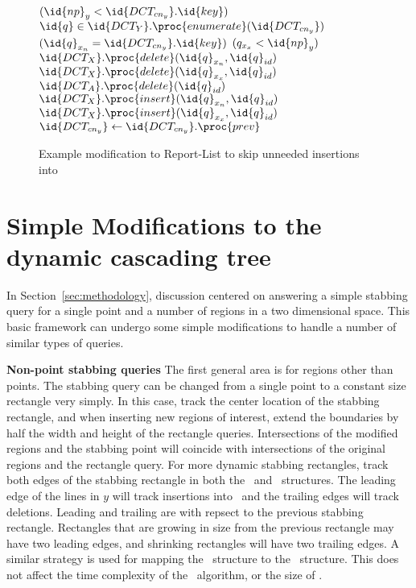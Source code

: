 \documentclass{sig-alternate}
\newcommand{\ct}{\id{DCT}}
\newcommand{\meth}{.}
\newcommand{\inC}[1]{{\id{DCT_{#1}}}}
\newcommand{\X}{{\inC{X}}}
\newcommand{\Y}{{\inC{Y}}}
\newcommand{\A}{{\inC{A}}}
\newcommand{\cny}{{\inC{cn_y}}}
\begin{document}
\begin{figure}[htbp]
  \centering
\begin{codebox}
\zi \While $(\id{np}_y < \cny \meth \id{key})$
\zi   \Do
      $\id{q} \in \Y \meth \proc{enumerate}(\cny)$
\zi       \Do
         \If $(\id{q}_{x_n} = \cny \meth \id{key})$
\zi            \Then
\zi               \If $(q_{x_x} < \id{np}_y)$
\zi                 \Then
\zi                   $\X \meth \proc{delete}(\id{q}_{x_n},\id{q}_{id})$
\zi                   $\X \meth \proc{delete}(\id{q}_{x_x},\id{q}_{id})$
\zi               $\A \meth \proc{delete}(\id{q}_{id})$
\zi                  \Else
\zi                   $\X \meth \proc{insert}(\id{q}_{x_n},\id{q}_{id})$
\zi                   $\X \meth \proc{insert}(\id{q}_{x_x},\id{q}_{id})$
                  \End
               \End
       \End
\zi     $\cny \gets \cny \meth \proc{prev}$
   \End
\end{codebox}
\caption{
%
  Example modification to Report-List to skip unneeded insertions into \X
%
}
  \label{fig:mod}
\end{figure}

\section{Simple Modifications to the dynamic cascading tree}
\label{sec:mods}

In Section~\ref{sec:methodology}, discussion centered on answering a
simple stabbing query for a single point and a number of regions in a
two dimensional space.  This basic framework can undergo some simple
modifications to handle a number of similar types of queries.

{\bf Non-point stabbing queries}
%
The first general area is for regions other than points.  The stabbing
query can be changed from a single point to a constant size rectangle
very simply.  In this case, track the center location of the stabbing
rectangle, and when inserting new regions of interest, extend the
boundaries by half the width and height of the rectangle queries.
Intersections of the modified regions and the stabbing point will
coincide with intersections of the original regions and the rectangle
query.  For more dynamic stabbing rectangles, track both edges of the
stabbing rectangle in both the \Y\ and \X\ structures.  The leading
edge of the lines in $y$ will track insertions into \A\ and the
trailing edges will track deletions.  Leading and trailing are with
repsect to the previous stabbing rectangle.  Rectangles that are
growing in size from the previous rectangle may have two leading
edges, and shrinking rectangles will have two trailing edges.  A
similar strategy is used for mapping the \X\ structure to the \A\ 
structure.  This does not affect the time complexity of the
\ algorithm, or the size of \ct.
\end{document}
